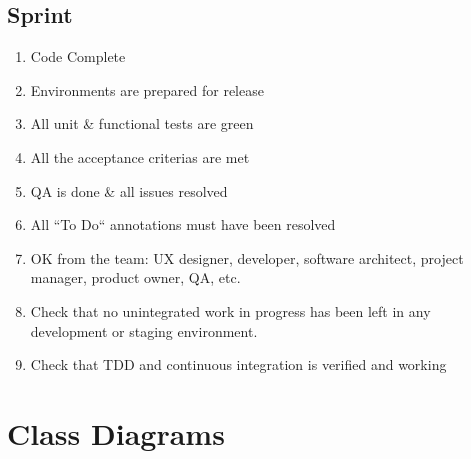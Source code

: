 \documentclass[12pt]{article}
\begin{document}
\subsection{Sprint}
\begin{enumerate}
	\item Code Complete
	\item Environments are prepared for release
	\item All unit \& functional tests are green
	\item All the acceptance criterias are met
	\item QA is done \& all issues resolved
	\item All ``To Do`` annotations must have been resolved
	\item OK from the team: UX designer, developer, software architect, project manager, product owner, QA, etc.
	\item Check that no unintegrated work in progress has been left in any development or staging environment.
	\item Check that TDD and continuous integration is verified and working
\end{enumerate}
\newpage

\section{Class Diagrams}
\end{document}
